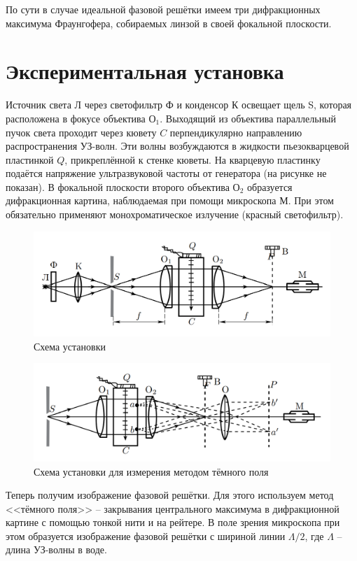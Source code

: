 \documentclass[12pt, a4paper]{article}
\begin{document}
По сути в случае идеальной фазовой решётки имеем три дифракционных максимума Фраунгофера, собираемых линзой 
в своей фокальной плоскости. 

\section{Экспериментальная установка}
Источник света Л через светофильтр Ф и конденсор К освещает щель S, 
которая расположена в фокусе объектива $О_1$. Выходящий из объектива
параллельный пучок света проходит через кювету $C$ перпендикулярно 
направлению распространения УЗ-волн. Эти волны возбуждаются в жидкости 
пьезокварцевой пластинкой $Q$, прикреплённой к стенке кюветы. На 
кварцевую пластинку подаётся напряжение ультразвуковой частоты от
генератора (на рисунке не показан). В фокальной плоскости второго 
объектива $О_2$ образуется дифракционная картина, наблюдаемая при 
помощи микроскопа $М$. При этом обязательно применяют 
монохроматическое излучение (красный светофильтр).

\begin{figure}[h]
  \includegraphics[width=0.8\linewidth]{pics/setup.png}
  \caption{Схема установки}
\end{figure}

\begin{figure}[H]
  \includegraphics[width=0.8\linewidth]{pics/setup-2.png}
  \caption{Схема установки для измерения методом тёмного поля}
\end{figure}
Теперь получим изображение фазовой решётки. Для этого используем метод <<тёмного поля>> -- 
закрывания центрального максимума в дифракционной картине с помощью тонкой нити и на рейтере. 
В поле зрения микроскопа при этом образуется изображение фазовой решётки с шириной линии
$\Lambda/2$, где $\Lambda$ -- длина УЗ-волны в воде.
\end{document}
